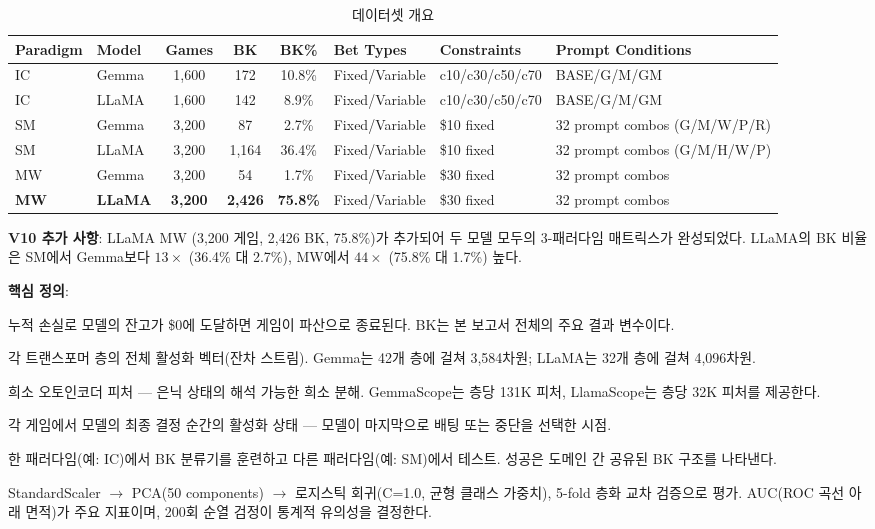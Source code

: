 \documentclass[11pt,a4paper]{article}
\begin{document}
\begin{table}[H]
\centering
\caption{데이터셋 개요}\label{tab:t1}
\footnotesize
\begin{tabular}{llcccllp{3.2cm}}
\toprule
Paradigm & Model & Games & BK & BK\% & Bet Types & Constraints & Prompt Conditions \\
\midrule
IC & Gemma & 1,600 & 172 & 10.8\% & Fixed/Variable & c10/c30/c50/c70 & BASE/G/M/GM \\
IC & LLaMA & 1,600 & 142 & 8.9\% & Fixed/Variable & c10/c30/c50/c70 & BASE/G/M/GM \\
SM & Gemma & 3,200 & 87 & 2.7\% & Fixed/Variable & \$10 fixed & 32 prompt combos (G/M/W/P/R) \\
SM & LLaMA & 3,200 & 1,164 & 36.4\% & Fixed/Variable & \$10 fixed & 32 prompt combos (G/M/H/W/P) \\
MW & Gemma & 3,200 & 54 & 1.7\% & Fixed/Variable & \$30 fixed & 32 prompt combos \\
\textbf{MW} & \textbf{LLaMA} & \textbf{3,200} & \textbf{2,426} & \textbf{75.8\%} & Fixed/Variable & \$30 fixed & 32 prompt combos \\
\bottomrule
\end{tabular}
\end{table}

\noindent\textbf{V10 추가 사항}: LLaMA MW (3,200 게임, 2,426 BK, 75.8\%)가 추가되어 두 모델 모두의 3-패러다임 매트릭스가 완성되었다. LLaMA의 BK 비율은 SM에서 Gemma보다 $13\times$ (36.4\% 대 2.7\%), MW에서 $44\times$ (75.8\% 대 1.7\%) 높다.

\medskip\noindent\textbf{핵심 정의}:
\begin{description}[nosep,leftmargin=1.5em,labelindent=0em]
    \item[파산 (BK, Bankruptcy)] 누적 손실로 모델의 잔고가 \$0에 도달하면 게임이 파산으로 종료된다. BK는 본 보고서 전체의 주요 결과 변수이다.
    \item[은닉 상태 (Hidden states)] 각 트랜스포머 층의 전체 활성화 벡터(잔차 스트림). Gemma는 42개 층에 걸쳐 3,584차원; LLaMA는 32개 층에 걸쳐 4,096차원.
    \item[SAE 피처] 희소 오토인코더 피처 --- 은닉 상태의 해석 가능한 희소 분해. GemmaScope는 층당 131K 피처, LlamaScope는 층당 32K 피처를 제공한다.
    \item[결정 시점 (Decision Point, DP)] 각 게임에서 모델의 최종 결정 순간의 활성화 상태 --- 모델이 마지막으로 배팅 또는 중단을 선택한 시점.
    \item[교차 도메인 전이 (Cross-domain transfer)] 한 패러다임(예: IC)에서 BK 분류기를 훈련하고 다른 패러다임(예: SM)에서 테스트. 성공은 도메인 간 공유된 BK 구조를 나타낸다.
    \item[분류 파이프라인] StandardScaler $\rightarrow$ PCA(50 components) $\rightarrow$ 로지스틱 회귀(C=1.0, 균형 클래스 가중치), 5-fold 층화 교차 검증으로 평가. AUC(ROC 곡선 아래 면적)가 주요 지표이며, 200회 순열 검정이 통계적 유의성을 결정한다.
\end{description}
\end{document}
